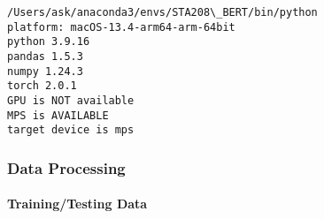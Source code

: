 \documentclass[11pt]{article}
\begin{document}
    \begin{Verbatim}[commandchars=\\\{\}]
/Users/ask/anaconda3/envs/STA208\_BERT/bin/python
platform: macOS-13.4-arm64-arm-64bit
python 3.9.16
pandas 1.5.3
numpy 1.24.3
torch 2.0.1
GPU is NOT available
MPS is AVAILABLE
target device is mps
    \end{Verbatim}

    \hypertarget{data-processing}{%
\subsubsection{Data Processing}\label{data-processing}}

    \hypertarget{trainingtesting-data}{%
\paragraph{Training/Testing Data}\label{trainingtesting-data}}
\end{document}
